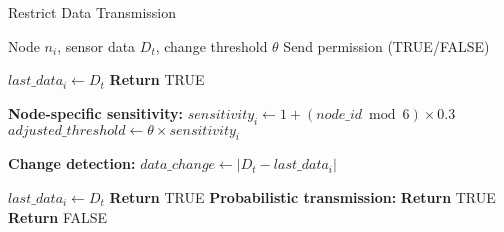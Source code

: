 \documentclass{article}
\begin{document}
\begin{algorithm}[H]
\caption{Restrict Data Transmission}
\label{alg:data_transmission}
\begin{algorithmic}[1]

\REQUIRE Node $n_i$, sensor data $D_t$, change threshold $\theta$
\ENSURE Send permission (TRUE/FALSE)

 
    \STATE $last\_data_i \leftarrow D_t$
    \STATE \textbf{Return} TRUE
\ENDIF

\STATE \textbf{Node-specific sensitivity:}
\STATE $sensitivity_i \leftarrow 1 + (node\_id \bmod 6) \times 0.3$
\STATE $adjusted\_threshold \leftarrow \theta \times sensitivity_i$

\STATE \textbf{Change detection:}
\STATE $data\_change \leftarrow |D_t - last\_data_i|$

    \STATE $last\_data_i \leftarrow D_t$
    \STATE \textbf{Return} TRUE
\ELSE
    \STATE \textbf{Probabilistic transmission:} 
        \STATE \textbf{Return} TRUE
    \ENDIF
    \STATE \textbf{Return} FALSE
\ENDIF

\end{algorithmic}
\end{algorithm}
\end{document}
